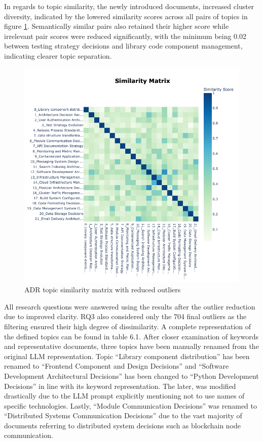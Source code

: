         In regards to topic similarity, the newly introduced documents, increased cluster diversity, indicated by the lowered similarity scores across all pairs of topics in figure \ref{fig:similarity_matrix_reduced}. Semantically similar pairs also retained their higher score while irrelevant pair scores were reduced significantly, with the minimum being 0.02 between testing strategy decisions and library code component management,  indicating clearer topic separation. 

        \begin{figure}[h]
            \centering
            \hspace*{-2cm} 
            \includegraphics[scale=0.55]{figures/BerTopic_Reduced/similarity_matrix_reduced_outliers.png}
            \caption{ADR topic similarity matrix with reduced outliers}
            \label{fig:similarity_matrix_reduced}
        \end{figure}

        All research questions were answered using the results after the outlier reduction due to improved clarity. RQ3 also considered only the 704 final outliers as the filtering ensured their high degree of dissimilarity. A complete representation of the defined topics can be found in table 6.1.
        After closer examination of keywords and representative documents, three topics have been manually renamed from the original LLM representation. Topic ``Library component distribution'' has been renamed to ``Frontend Component and Design Decisions'' and ``Software Development Architectural Decisions'' has been changed to ``Python Development Decisions'' in line with its keyword representation. The later, was modified drastically due to the LLM prompt explicitly mentioning not to use names of specific technologies. Lastly, ``Module Communication Decisions'' was renamed to ``Distributed Systems Communication Decisions'' due to the vast majority of documents referring to distributed system decisions such as blockchain node communication.
        
